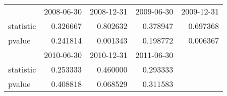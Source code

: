 \begin{tabular}{lrrrr}
    \toprule
    {}        & 2008-06-30 & 2008-12-31 & 2009-06-30 & 2009-12-31\\
    statistic & 0.326667   & 0.802632   & 0.378947   & 0.697368   \\
    pvalue    & 0.241814   & 0.001343   & 0.198772   & 0.006367   \\
    \midrule
    {}        & 2010-06-30 & 2010-12-31 & 2011-06-30 &            \\
    statistic & 0.253333   & 0.460000   & 0.293333   &            \\
    pvalue    & 0.408818   & 0.068529   & 0.311583   &            \\
    \bottomrule
\end{tabular}
